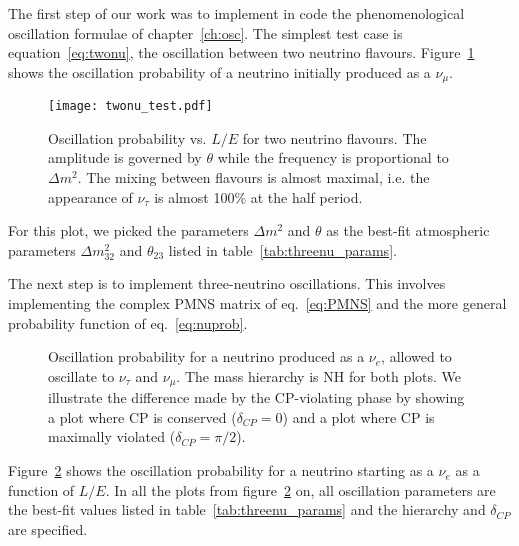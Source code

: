 The first step of our work was to implement in code the phenomenological
oscillation formulae of chapter~\ref{ch:osc}. The simplest test case
is equation~\ref{eq:twonu}, the oscillation between two neutrino flavours.
Figure~\ref{fig:twonu_plots} shows the oscillation
probability of a neutrino initially produced as a $\nu_\mu$. 
\begin{figure}
	\centering
	\texttt{[image: twonu\_test.pdf]}
	\captionsetup{width=0.9\textwidth}
	\caption{Oscillation probability vs. $L/E$ for two neutrino flavours. The
	amplitude is governed by $\theta$ while the frequency is proportional to
	$\Delta m^2$. The mixing between flavours is almost maximal, i.e. the
	appearance of $\nu_\tau$ is almost 100\% at the half period.}
	\label{fig:twonu_plots}
\end{figure}
For this plot, we picked the parameters $\Delta m^2$ and $\theta$ as the
best-fit atmospheric parameters $\Delta m^2_{32}$ and $\theta_{23}$ listed in
table~\ref{tab:threenu_params}.


The next step is to implement three-neutrino oscillations. This involves
implementing the complex PMNS matrix of eq.~\ref{eq:PMNS} and the more general
probability function of eq.~\ref{eq:nuprob}. 
\begin{figure}
	\centering
\caption{Oscillation probability for a neutrino produced as a $\nu_e$, allowed to
	oscillate to $\nu_\tau$ and $\nu_\mu$. The mass hierarchy is NH for both
	plots. We illustrate the difference made by
	the CP-violating phase by showing a plot where CP is conserved
	($\delta_{CP}=0$) and a plot where CP is maximally violated ($\delta_{CP} =
	\pi/2$).}
\label{fig:threenu_plots}
\end{figure}
Figure~\ref{fig:threenu_plots} shows the oscillation probability for a neutrino
starting as a $\nu_e$ as a function of $L/E$. In all the plots
from figure~\ref{fig:threenu_plots} on, all oscillation parameters are the
best-fit values listed in table~\ref{tab:threenu_params} and the hierarchy and
$\delta_{CP}$ are specified.



